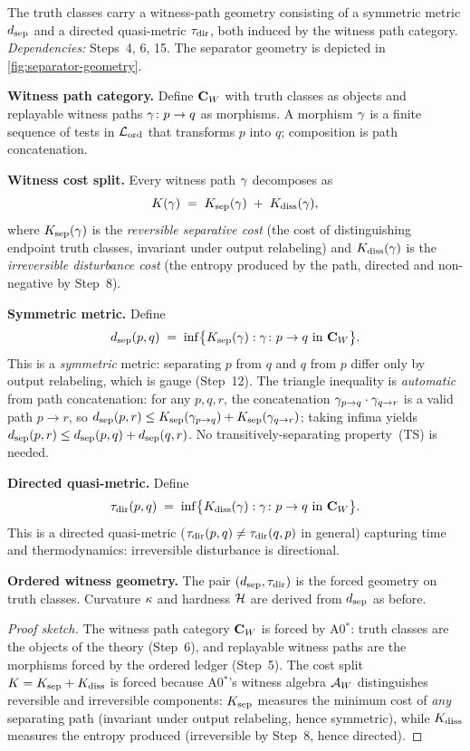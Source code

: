 \begin{theorem}
\label{thm:separator-geometry}
The truth classes carry a witness-path geometry consisting of a symmetric
metric $d_{\mathrm{sep}}$ and a directed quasi-metric $\tau_{\mathrm{dir}}$, both induced by the
witness path category.
\emph{Dependencies:} Steps~4, 6, 15.
The separator geometry is depicted in \cref{fig:separator-geometry}.

\medskip\noindent
\textbf{Witness path category.}  Define $\mathbf{C}_W$ with truth classes as
objects and replayable witness paths $\gamma \colon p \to q$ as morphisms.
A morphism $\gamma$ is a finite sequence of tests in $\mathcal{L}_{\mathrm{ord}}$ that
transforms $p$ into $q$; composition is path concatenation.

\medskip\noindent
\textbf{Witness cost split.}  Every witness path $\gamma$ decomposes as
\[
  K(\gamma) \;=\; K_{\mathrm{sep}}(\gamma) \;+\; K_{\mathrm{diss}}(\gamma),
\]
where $K_{\mathrm{sep}}(\gamma)$ is the \emph{reversible separative cost}
(the cost of distinguishing endpoint truth classes, invariant under
output relabeling) and $K_{\mathrm{diss}}(\gamma)$ is the \emph{irreversible
disturbance cost} (the entropy produced by the path, directed and
non-negative by Step~8).

\medskip\noindent
\textbf{Symmetric metric.}  Define
\[
  d_{\mathrm{sep}}(p, q) \;=\; \inf\bigl\{K_{\mathrm{sep}}(\gamma) : \gamma \colon p \to q
  \text{ in } \mathbf{C}_W\bigr\}.
\]
This is a \emph{symmetric} metric: separating $p$ from $q$ and $q$ from $p$
differ only by output relabeling, which is gauge (Step~12).  The triangle
inequality is \emph{automatic} from path concatenation: for any
$p, q, r$, the concatenation $\gamma_{p \to q} \cdot \gamma_{q \to r}$
is a valid path $p \to r$, so
$d_{\mathrm{sep}}(p, r) \leq K_{\mathrm{sep}}(\gamma_{p \to q}) + K_{\mathrm{sep}}(\gamma_{q \to r})$;
taking infima yields $d_{\mathrm{sep}}(p, r) \leq d_{\mathrm{sep}}(p, q) + d_{\mathrm{sep}}(q, r)$.  No
transitively-separating property~(TS) is needed.

\medskip\noindent
\textbf{Directed quasi-metric.}  Define
\[
  \tau_{\mathrm{dir}}(p, q) \;=\; \inf\bigl\{K_{\mathrm{diss}}(\gamma) : \gamma \colon p \to q
  \text{ in } \mathbf{C}_W\bigr\}.
\]
This is a directed quasi-metric ($\tau_{\mathrm{dir}}(p,q) \neq \tau_{\mathrm{dir}}(q,p)$ in general)
capturing time and thermodynamics: irreversible disturbance is directional.

\medskip\noindent
\textbf{Ordered witness geometry.}  The pair $(d_{\mathrm{sep}}, \tau_{\mathrm{dir}})$ is the
forced geometry on truth classes.  Curvature $\kappa$ and hardness
$\mathcal{H}$ are derived from $d_{\mathrm{sep}}$ as before.
\begin{proof}[Proof sketch]
The witness path category $\mathbf{C}_W$ is forced by A0$^*$: truth classes are
the objects of the theory (Step~6), and replayable witness paths are the
morphisms forced by the ordered ledger (Step~5).  The cost split
$K = K_{\mathrm{sep}} + K_{\mathrm{diss}}$ is forced because A0$^*$'s witness algebra $\mathcal{A}_W$
distinguishes reversible and irreversible components: $K_{\mathrm{sep}}$ measures
the minimum cost of \emph{any} separating path (invariant under output
relabeling, hence symmetric), while $K_{\mathrm{diss}}$ measures the entropy
produced (irreversible by Step~8, hence directed).


\end{proof}
\end{theorem}
